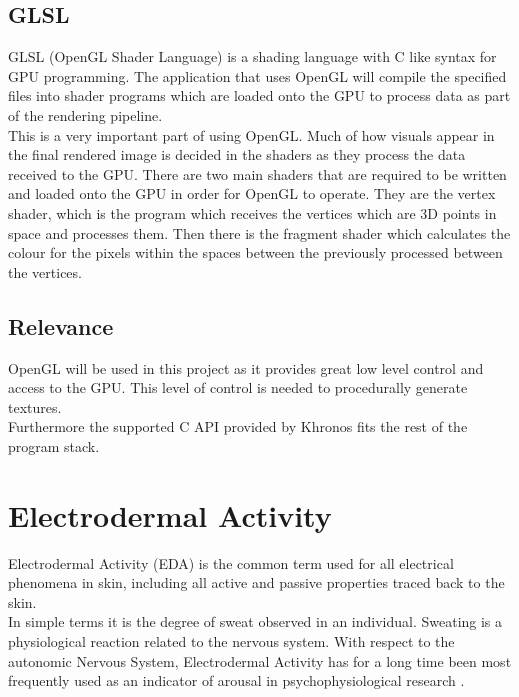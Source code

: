 \documentclass{report}
\begin{document}
\subsection{GLSL}
GLSL (OpenGL Shader Language) is a shading language with C like syntax for GPU programming. The application that uses OpenGL will compile the specified files into shader programs which are loaded onto the GPU to process data as part of the rendering pipeline.\\
This is a very important part of using OpenGL. Much of how visuals appear in the final rendered image is decided in the shaders as they process the data received to the GPU.
There are two main shaders that are required to be written and loaded onto the GPU in order for OpenGL to operate. They are the vertex shader, which is the program which receives the vertices which are 3D points in space and processes them. Then there is the fragment shader which calculates the colour for the pixels within the spaces between the previously processed between the vertices.

\subsection{Relevance}

OpenGL will be used in this project as it provides great low level control and access to the GPU. This level of control is needed to procedurally generate textures.\\
Furthermore the supported C API provided by Khronos fits the rest of the program stack.

\section{Electrodermal Activity}

Electrodermal Activity (\Gls{EDA}) is the common term used for all electrical phenomena in skin, including all active and passive properties traced back to the skin.\\
In simple terms it is the degree of sweat observed in an individual. Sweating is a physiological reaction related to the nervous system.
With respect to the autonomic Nervous System, Electrodermal Activity has for a long time been most frequently used as an indicator of arousal in psychophysiological research \citep{duffy1972handbook}.
\end{document}

